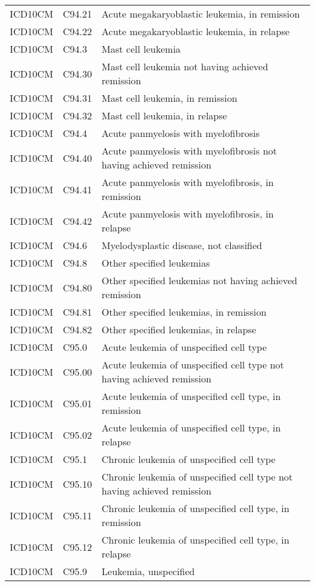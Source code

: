 \begin{longtable}{p{}p{}p{}}
  ICD10CM & C94.21 & Acute megakaryoblastic leukemia, in remission \\ 
  ICD10CM & C94.22 & Acute megakaryoblastic leukemia, in relapse \\ 
  ICD10CM & C94.3 & Mast cell leukemia \\ 
  ICD10CM & C94.30 & Mast cell leukemia not having achieved remission \\ 
  ICD10CM & C94.31 & Mast cell leukemia, in remission \\ 
  ICD10CM & C94.32 & Mast cell leukemia, in relapse \\ 
  ICD10CM & C94.4 & Acute panmyelosis with myelofibrosis \\ 
  ICD10CM & C94.40 & Acute panmyelosis with myelofibrosis not having achieved remission \\ 
  ICD10CM & C94.41 & Acute panmyelosis with myelofibrosis, in remission \\ 
  ICD10CM & C94.42 & Acute panmyelosis with myelofibrosis, in relapse \\ 
  ICD10CM & C94.6 & Myelodysplastic disease, not classified \\ 
  ICD10CM & C94.8 & Other specified leukemias \\ 
  ICD10CM & C94.80 & Other specified leukemias not having achieved remission \\ 
  ICD10CM & C94.81 & Other specified leukemias, in remission \\ 
  ICD10CM & C94.82 & Other specified leukemias, in relapse \\ 
  ICD10CM & C95.0 & Acute leukemia of unspecified cell type \\ 
  ICD10CM & C95.00 & Acute leukemia of unspecified cell type not having achieved remission \\ 
  ICD10CM & C95.01 & Acute leukemia of unspecified cell type, in remission \\ 
  ICD10CM & C95.02 & Acute leukemia of unspecified cell type, in relapse \\ 
  ICD10CM & C95.1 & Chronic leukemia of unspecified cell type \\ 
  ICD10CM & C95.10 & Chronic leukemia of unspecified cell type not having achieved remission \\ 
  ICD10CM & C95.11 & Chronic leukemia of unspecified cell type, in remission \\ 
  ICD10CM & C95.12 & Chronic leukemia of unspecified cell type, in relapse \\ 
  ICD10CM & C95.9 & Leukemia, unspecified \\ 

\end{longtable}
